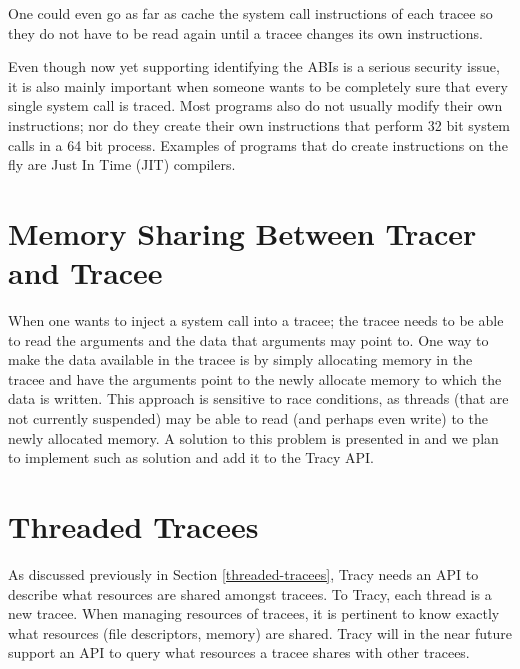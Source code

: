 \documentclass[a4paper, 10pt]{report}
\begin{document}
One could even go as far as cache the system call instructions of each tracee
so they do not have to be read again until a tracee changes its own
instructions.

Even though now yet supporting identifying the ABIs is a serious security issue,
it is also mainly important when someone wants to be completely sure that every
single system call is traced. Most programs also do not usually modify their
own instructions; nor do they create their own instructions that perform 32 bit
system calls in a 64 bit process. Examples of programs that do create
instructions on the fly are Just In Time (JIT) compilers.

\section{Memory Sharing Between Tracer and Tracee}
\label{memory-share}

When one wants to inject a system call into a tracee; the tracee needs to be
able to read the arguments and the data that arguments may point to. One way to
make the data available in the tracee is by simply allocating memory in the
tracee and have the arguments point to the newly allocate memory to which the
data is written. This approach is sensitive to race conditions, as threads (that
are not currently suspended) may be able to read (and perhaps even write) to
the newly allocated memory. A solution to this problem is presented in
\cite{Noordende_asecure} and we plan to implement such as solution and add it
to the Tracy API.


\section{Threaded Tracees}
\label{future-threaded-tracees}

As discussed previously in Section \ref{threaded-tracees}, Tracy needs an API to
describe what resources are shared amongst tracees. To Tracy, each thread is a
new tracee. When managing resources of tracees, it is pertinent to know exactly
what resources (file descriptors, memory) are shared. Tracy will in the near
future support an API to query what resources a tracee shares with other
tracees.

%
\end{document}
